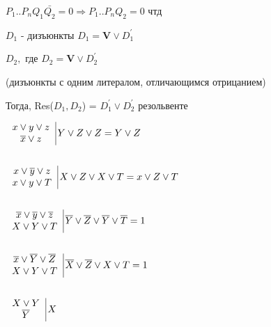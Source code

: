 \documentclass[russian]{lecture-notes}
\begin{document}
	$P_{1}..P_{n} Q_{1}\bar{Q_{2}} = 0 \Rightarrow P_{1}..P_{n}Q_{2} = 0 $ чтд

	\begin{definition}
		$D_{1}$ - дизъюнкты $D_{1} = \mathbf{V} \lor D_{1}^{'}$

		$D_{2} ,$ где $D_{2} = \mathbf{V} \lor D_{2}^{'}$

		(дизъюнкты с одним литералом, отличающимся отрицанием)

		Тогда, Res($D_{1},D_{2}$) = $D_{1}^{'} \lor D_{2}^{'}$ резольвенте

		\end{definition}

		\begin{example}
		$
\left.
  \begin{array}{c}
     x \lor y \lor z  \\
      \overline{x} \lor z  \\
  \end{array}
\right. \vline Y \lor Z \lor Z = Y \lor Z
$

 $ $

$
	\left.
  \begin{array}{c}
     x \lor \overline{y} \lor z  \\
     x \lor y \lor T  \\
  \end{array}
\right. \vline X \lor Z \lor X \lor T = x \lor Z \lor T
$


 $ $

$
	\left.
  \begin{array}{c}
     \overline{x} \lor \overline{y} \lor \overline{z}  \\
      X \lor Y \lor T  \\
  \end{array}
\right. \vline \overline{Y} \lor \overline{Z} \lor \overline{Y} \lor \overline{T} = 1
$

$ $


$
	\left.
  \begin{array}{c}
     \overline{x} \lor \overline{Y} \lor \overline{Z}  \\
      X \lor Y \lor T  \\
  \end{array}
\right. \vline \overline{X} \lor \overline{Z} \lor X \lor T = 1
$


$ $


$
	\left.
  \begin{array}{c}
      X \lor Y  \\
      \overline{Y}   \\
  \end{array}
\right. \vline X
$


\end{example}
\end{document}

